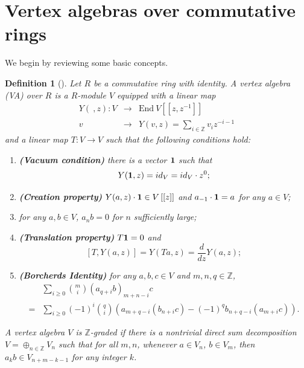 \documentclass[12pt]{article}
\def\labtt#1{\label {#1} }
\def\ZZ{{\mathbb Z}}
\def\vac{\hbox{\bf 1}} %
\newtheorem{de}[thm]{Definition}
\begin{document}
\section{Vertex algebras over commutative rings}


We begin by reviewing some basic concepts.


\begin{de}[\cite{borcherds,BR,FLM}]\labtt{defva}
Let $R$ be a commutative ring with identity.  A vertex algebra (VA) over $R$  is a $R$-module $V$ equipped with a linear map
\begin{eqnarray*}
Y(\ ,z):V &\longrightarrow &\mathrm{End}\ V\left[ \left[ z,z^{-1}\right]
\right] \\
v &\longrightarrow &Y(v,z)=\sum_{i\in \mathbb{Z}}v_{i}z^{-i-1}
\end{eqnarray*}
and a linear map $T:V \to V$ such that the following conditions hold:

\begin{enumerate}
\item  \textbf{(Vacuum condition)} there is a vector $\vac$ such that
\[
Y(\vac,z)=id_V = id_V \cdot z^0;
\]

\item  \textbf{(Creation property)} $Y(a,z)\cdot \vac\in V\left[ \left[ z\right] \right]
$ and $a_{-1}\cdot \vac =a$ for any $a\in V$;


\item  for any $a,b\in V$,  $a_{n}b=0$  for  $n$  sufficiently large;


\item  \textbf{(Translation  property)}   $T\vac =0$ and
\[
[T, Y( a,z)] =Y(Ta, z)= \frac{d}{dz}Y(a,z);
\]

\item  \textbf{(Borcherds Identity)} for any $a,b,c\in V$ and  $m,n, q\in \mathbb{Z}$,
\[
\begin{split}
&\sum_{i\geq 0} \binom{m}{i} (a_{q+i}b)_{m+n-i} c\\
 = & \sum_{i\geq 0} (-1)^ i  \binom{q}{ i} \left( a_{m+q-i} (b_{n+i}c) -  (-1)^q  b_{n+q-i} (a_{m+i} c) \right).
 \end{split}
 \]
\end{enumerate}

A vertex algebra $V$ is $\mathbb{Z}$-graded if there is a nontrivial direct sum decomposition  $ V=\oplus _{n\in \ZZ}  V_{n}$ such that  for all $m,n$, whenever   $a\in V_n$, $b\in V_m$,  then $a_k b\in V_{n+m-k-1}$ for any integer $k$.
\end{de}
\end{document}
